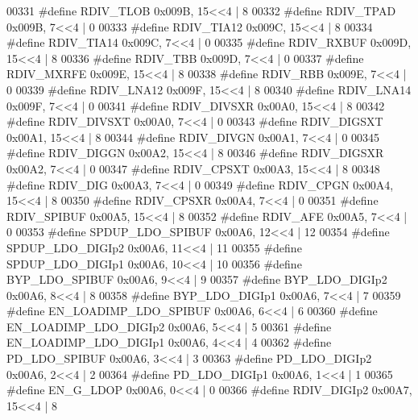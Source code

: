 \begin{DoxyCode}
00331 \textcolor{preprocessor}{#define RDIV\_TLOB 0x009B, 15<<4 |  8}
00332 \textcolor{preprocessor}{#define RDIV\_TPAD 0x009B, 7<<4 |  0}
00333 \textcolor{preprocessor}{#define RDIV\_TIA12 0x009C, 15<<4 |  8}
00334 \textcolor{preprocessor}{#define RDIV\_TIA14 0x009C, 7<<4 |  0}
00335 \textcolor{preprocessor}{#define RDIV\_RXBUF 0x009D, 15<<4 |  8}
00336 \textcolor{preprocessor}{#define RDIV\_TBB 0x009D, 7<<4 |  0}
00337 \textcolor{preprocessor}{#define RDIV\_MXRFE 0x009E, 15<<4 |  8}
00338 \textcolor{preprocessor}{#define RDIV\_RBB 0x009E, 7<<4 |  0}
00339 \textcolor{preprocessor}{#define RDIV\_LNA12 0x009F, 15<<4 |  8}
00340 \textcolor{preprocessor}{#define RDIV\_LNA14 0x009F, 7<<4 |  0}
00341 \textcolor{preprocessor}{#define RDIV\_DIVSXR 0x00A0, 15<<4 |  8}
00342 \textcolor{preprocessor}{#define RDIV\_DIVSXT 0x00A0, 7<<4 |  0}
00343 \textcolor{preprocessor}{#define RDIV\_DIGSXT 0x00A1, 15<<4 |  8}
00344 \textcolor{preprocessor}{#define RDIV\_DIVGN 0x00A1, 7<<4 |  0}
00345 \textcolor{preprocessor}{#define RDIV\_DIGGN 0x00A2, 15<<4 |  8}
00346 \textcolor{preprocessor}{#define RDIV\_DIGSXR 0x00A2, 7<<4 |  0}
00347 \textcolor{preprocessor}{#define RDIV\_CPSXT 0x00A3, 15<<4 |  8}
00348 \textcolor{preprocessor}{#define RDIV\_DIG 0x00A3, 7<<4 |  0}
00349 \textcolor{preprocessor}{#define RDIV\_CPGN 0x00A4, 15<<4 |  8}
00350 \textcolor{preprocessor}{#define RDIV\_CPSXR 0x00A4, 7<<4 |  0}
00351 \textcolor{preprocessor}{#define RDIV\_SPIBUF 0x00A5, 15<<4 |  8}
00352 \textcolor{preprocessor}{#define RDIV\_AFE 0x00A5, 7<<4 |  0}
00353 \textcolor{preprocessor}{#define SPDUP\_LDO\_SPIBUF 0x00A6, 12<<4 |  12}
00354 \textcolor{preprocessor}{#define SPDUP\_LDO\_DIGIp2 0x00A6, 11<<4 |  11}
00355 \textcolor{preprocessor}{#define SPDUP\_LDO\_DIGIp1 0x00A6, 10<<4 |  10}
00356 \textcolor{preprocessor}{#define BYP\_LDO\_SPIBUF 0x00A6, 9<<4 |  9}
00357 \textcolor{preprocessor}{#define BYP\_LDO\_DIGIp2 0x00A6, 8<<4 |  8}
00358 \textcolor{preprocessor}{#define BYP\_LDO\_DIGIp1 0x00A6, 7<<4 |  7}
00359 \textcolor{preprocessor}{#define EN\_LOADIMP\_LDO\_SPIBUF 0x00A6, 6<<4 |  6}
00360 \textcolor{preprocessor}{#define EN\_LOADIMP\_LDO\_DIGIp2 0x00A6, 5<<4 |  5}
00361 \textcolor{preprocessor}{#define EN\_LOADIMP\_LDO\_DIGIp1 0x00A6, 4<<4 |  4}
00362 \textcolor{preprocessor}{#define PD\_LDO\_SPIBUF 0x00A6, 3<<4 |  3}
00363 \textcolor{preprocessor}{#define PD\_LDO\_DIGIp2 0x00A6, 2<<4 |  2}
00364 \textcolor{preprocessor}{#define PD\_LDO\_DIGIp1 0x00A6, 1<<4 |  1}
00365 \textcolor{preprocessor}{#define EN\_G\_LDOP 0x00A6, 0<<4 |  0}
00366 \textcolor{preprocessor}{#define RDIV\_DIGIp2 0x00A7, 15<<4 |  8}

\end{DoxyCode}
